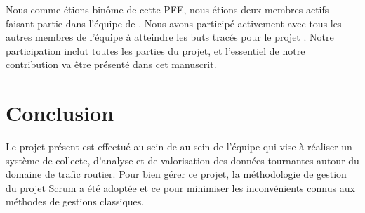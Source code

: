 Nous comme étions binôme de cette PFE, nous étions deux membres actifs faisant
partie dans l'équipe de . Nous avons participé activement
avec tous les autres membres de l'équipe à atteindre les buts tracés pour le
projet . Notre participation inclut toutes les parties du
projet, et l'essentiel de notre contribution va être présenté dans cet
manuscrit.




\section*{Conclusion}

Le projet présent est effectué au sein de  au sein
de l'équipe  qui vise à réaliser un système de collecte,
d'analyse et de valorisation des données tournantes autour du domaine de trafic
routier. Pour bien gérer ce projet, la méthodologie de gestion du projet Scrum
a été adoptée et ce pour minimiser les inconvénients connus aux méthodes de
gestions classiques.
